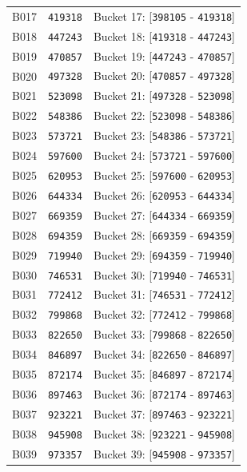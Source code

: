\documentclass[11pt,a4paper]{article}
\begin{document}
{\begin{xltabular}{\textwidth}{l | C | C}
B017 & \texttt{419318} & Bucket 17: [\texttt{398105} - \texttt{419318}] \\
B018 & \texttt{447243} & Bucket 18: [\texttt{419318} - \texttt{447243}] \\
B019 & \texttt{470857} & Bucket 19: [\texttt{447243} - \texttt{470857}] \\
B020 & \texttt{497328} & Bucket 20: [\texttt{470857} - \texttt{497328}] \\
B021 & \texttt{523098} & Bucket 21: [\texttt{497328} - \texttt{523098}] \\
B022 & \texttt{548386} & Bucket 22: [\texttt{523098} - \texttt{548386}] \\
B023 & \texttt{573721} & Bucket 23: [\texttt{548386} - \texttt{573721}] \\
B024 & \texttt{597600} & Bucket 24: [\texttt{573721} - \texttt{597600}] \\
B025 & \texttt{620953} & Bucket 25: [\texttt{597600} - \texttt{620953}] \\
B026 & \texttt{644334} & Bucket 26: [\texttt{620953} - \texttt{644334}] \\
B027 & \texttt{669359} & Bucket 27: [\texttt{644334} - \texttt{669359}] \\
B028 & \texttt{694359} & Bucket 28: [\texttt{669359} - \texttt{694359}] \\
B029 & \texttt{719940} & Bucket 29: [\texttt{694359} - \texttt{719940}] \\
B030 & \texttt{746531} & Bucket 30: [\texttt{719940} - \texttt{746531}] \\
B031 & \texttt{772412} & Bucket 31: [\texttt{746531} - \texttt{772412}] \\
B032 & \texttt{799868} & Bucket 32: [\texttt{772412} - \texttt{799868}] \\
B033 & \texttt{822650} & Bucket 33: [\texttt{799868} - \texttt{822650}] \\
B034 & \texttt{846897} & Bucket 34: [\texttt{822650} - \texttt{846897}] \\
B035 & \texttt{872174} & Bucket 35: [\texttt{846897} - \texttt{872174}] \\
B036 & \texttt{897463} & Bucket 36: [\texttt{872174} - \texttt{897463}] \\
B037 & \texttt{923221} & Bucket 37: [\texttt{897463} - \texttt{923221}] \\
B038 & \texttt{945908} & Bucket 38: [\texttt{923221} - \texttt{945908}] \\
B039 & \texttt{973357} & Bucket 39: [\texttt{945908} - \texttt{973357}] \\

\end{xltabular}}
\end{document}
